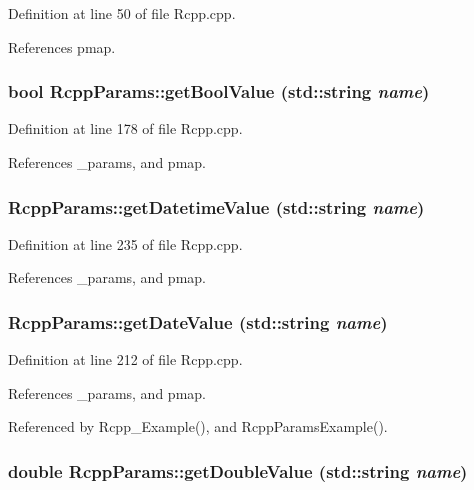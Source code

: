 Definition at line 50 of file Rcpp.cpp.

References pmap.\hypertarget{classRcppParams_d818a50a0e269360f3f74c5259dec882}{
\subsubsection[{getBoolValue}]{\setlength{\rightskip}{0pt plus 5cm}bool RcppParams::getBoolValue (std::string {\em name})}}
\label{classRcppParams_d818a50a0e269360f3f74c5259dec882}




Definition at line 178 of file Rcpp.cpp.

References \_\-params, and pmap.\hypertarget{classRcppParams_a4bec8bfe32d5079e64dc1c9a8fcf1b9}{
\subsubsection[{getDatetimeValue}]{ RcppParams::getDatetimeValue (std::string {\em name})}}
\label{classRcppParams_a4bec8bfe32d5079e64dc1c9a8fcf1b9}




Definition at line 235 of file Rcpp.cpp.

References \_\-params, and pmap.\hypertarget{classRcppParams_ae20c7ee73aa2f1176837cc9387ad008}{
\subsubsection[{getDateValue}]{ RcppParams::getDateValue (std::string {\em name})}}
\label{classRcppParams_ae20c7ee73aa2f1176837cc9387ad008}




Definition at line 212 of file Rcpp.cpp.

References \_\-params, and pmap.

Referenced by Rcpp\_\-Example(), and RcppParamsExample().\hypertarget{classRcppParams_a45f8bc1cd8a64aa9a98e24158407077}{
\subsubsection[{getDoubleValue}]{\setlength{\rightskip}{0pt plus 5cm}double RcppParams::getDoubleValue (std::string {\em name})}}
\label{classRcppParams_a45f8bc1cd8a64aa9a98e24158407077}




